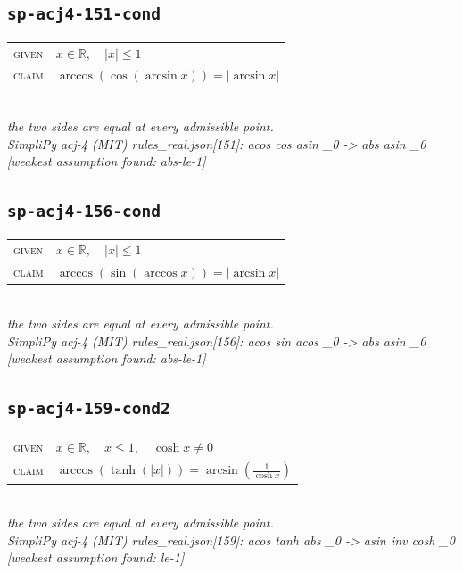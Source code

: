 \documentclass[11pt]{article}
\begin{document}
\subsection*{\texttt{sp-acj4-151-cond}}
\begin{tabular}{@{}l@{\quad}l@{}}
\textsc{given} & $x \in \mathbb{R},\quad \left|x\right| \le 1$ \\[4pt]
\textsc{claim} & $\displaystyle \arccos\left(\cos\left(\arcsin x\right)\right) = \left|\arcsin x\right|$ \\
\end{tabular}\\[2pt]
{\small\emph{the two sides are equal at every admissible point.}}\\
\emph{SimpliPy acj-4 (MIT) rules\_real.json[151]: acos cos asin \_0  ->  abs asin \_0  [weakest assumption found: abs-le-1]}\\

\subsection*{\texttt{sp-acj4-156-cond}}
\begin{tabular}{@{}l@{\quad}l@{}}
\textsc{given} & $x \in \mathbb{R},\quad \left|x\right| \le 1$ \\[4pt]
\textsc{claim} & $\displaystyle \arccos\left(\sin\left(\arccos x\right)\right) = \left|\arcsin x\right|$ \\
\end{tabular}\\[2pt]
{\small\emph{the two sides are equal at every admissible point.}}\\
\emph{SimpliPy acj-4 (MIT) rules\_real.json[156]: acos sin acos \_0  ->  abs asin \_0  [weakest assumption found: abs-le-1]}\\

\subsection*{\texttt{sp-acj4-159-cond2}}
\begin{tabular}{@{}l@{\quad}l@{}}
\textsc{given} & $x \in \mathbb{R},\quad x \le 1,\quad \cosh x \neq 0$ \\[4pt]
\textsc{claim} & $\displaystyle \arccos\left(\tanh\left(\left|x\right|\right)\right) = \arcsin\left(\frac{1}{\cosh x}\right)$ \\
\end{tabular}\\[2pt]
{\small\emph{the two sides are equal at every admissible point.}}\\
\emph{SimpliPy acj-4 (MIT) rules\_real.json[159]: acos tanh abs \_0  ->  asin inv cosh \_0  [weakest assumption found: le-1]}\\
\end{document}
